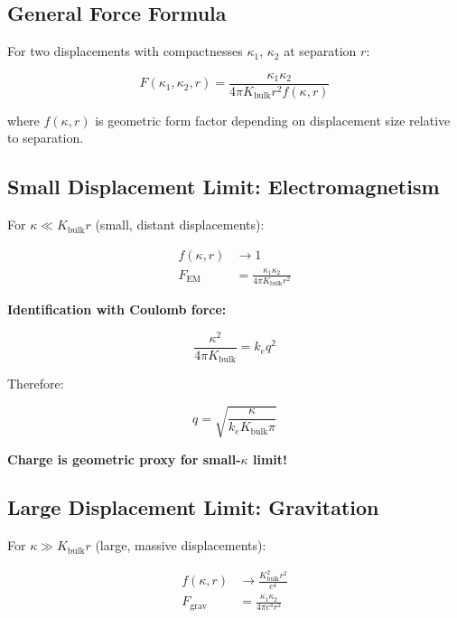 \subsection{General Force Formula}

For two displacements with compactnesses $\kappa_1$, $\kappa_2$ at separation $r$:

\begin{equation}
F(\kappa_1, \kappa_2, r) = \frac{\kappa_1 \kappa_2}{4\pi K_{\text{bulk}} r^2 f(\kappa, r)}
\label{eq:general_force}
\end{equation}

where $f(\kappa, r)$ is geometric form factor depending on displacement size relative to separation.

\subsection{Small Displacement Limit: Electromagnetism}

For $\kappa \ll K_{\text{bulk}} r$ (small, distant displacements):

\begin{align}
f(\kappa, r) &\to 1 \\
F_{\text{EM}} &= \frac{\kappa_1 \kappa_2}{4\pi K_{\text{bulk}} r^2}
\end{align}

\textbf{Identification with Coulomb force:}

\begin{equation}
\frac{\kappa^2}{4\pi K_{\text{bulk}}} = k_e q^2
\end{equation}

Therefore:

\begin{equation}
q = \sqrt{\frac{\kappa}{k_e K_{\text{bulk}} \pi}}
\end{equation}

\textbf{Charge is geometric proxy for small-$\kappa$ limit!}

\subsection{Large Displacement Limit: Gravitation}

For $\kappa \gg K_{\text{bulk}} r$ (large, massive displacements):

\begin{align}
f(\kappa, r) &\to \frac{K_{\text{bulk}}^2 r^2}{c^4} \\
F_{\text{grav}} &= \frac{\kappa_1 \kappa_2}{4\pi c^4 r^2}
\end{align}

